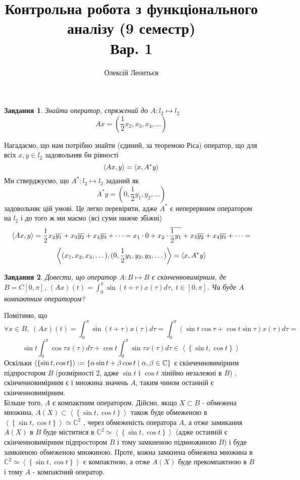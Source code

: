 \documentclass[12pt]{article} %
\title{Контрольна робота з функціонального аналізу (9 семестр)\\Вар. 1}
\author{Олексій Леонтьєв}
\newtheorem{prob}{Завдання}
\begin{document}
\maketitle
\begin{prob}Знайти оператор, спряжений до $A:l_2\mapsto l_2$\[Ax=(\frac{1}{2}x_2,x_3,x_4,\dots)\]\end{prob}
	Нагадаємо, що нам потрібно знайти (єдиний, за теоремою Ріса) оператор, що для всіх $x,y\in l_2$ задовольняв би рівності
	\[\left<Ax,y\right>=\left<x,A^*y\right>\]
	Ми стверджуємо, що $A^*:l_2\mapsto l_2$ заданий як
	\[A^*y=(0,\frac{1}{2}y_1,y_2,\dots)\]
	задовольняє цій умові. Це легко перевірити, адже $A^*$ є неперервним оператором на $l_2$ і до того ж ми маємо (всі суми нижче збіжні)
	\[\left<Ax,y\right>=
	\frac{1}{2}x_2\overline{y_1}+x_3\overline{y_2}+x_4\overline{y_3}+\dots=
	x_1\cdot 0+x_2\cdot\overline{\frac{1}{2}y_1}+x_3\overline{y_2}+x_4\overline{y_3}+\dots=\]
	\[\left<(x_1,x_2,x_3,\dots),(0,\frac{1}{2}y_1,y_2,y_3,\dots)\right>=\left<x,A^*y\right>\]
\begin{prob}Довести, що оператор $A:B\mapsto B$ є скінченновимірним, де $B=C[0,\pi]$, $(Ax)(t)=\int_0^{\pi}\sin(t+\tau)x(\tau)d\tau,\;t\in[0,\pi]$.
	Чи буде $A$ компактним оператором?\end{prob}
	Помітимо, що
	\[\forall x\in B,\;(Ax)(t)=\int_0^{\pi}\sin(t+\tau)x(\tau)d\tau=\int_0^{\pi}\left(\sin t\cos\tau+\cos t\sin\tau\right)x(\tau)d\tau=\]
	\[\sin t\int_0^{\pi}\cos\tau x(\tau)d\tau+\cos t\int_0^{\pi}\sin\tau x(\tau)d\tau\in \left<\left\{\sin t,\cos t\right\}\right>\]
	Оскільки $\left<\left\{\sin t,\cos t\right\}\right>:=\left\{\alpha\sin t+\beta\cos t\mid \alpha,\beta\in\mathbb{C}\right\}$ є скінченновимірним
	підпростором $B$ (розмірності 2, адже $\sin t$ і $\cos t$ лінійно незалежні в $B$)
	, скінченновимірним є і множина значень $A$, таким чином останній є скінченновимірним.\\
	Більше того, $A$ є компактним оператором. Дійсно, якщо $X\subset B$ - обмежена множина, $A(X)\subset
	\left<\left\{\sin t,\cos t\right\}\right>$ також буде обмеженою в $\left<\left\{\sin t,\cos t\right\}\right>\simeq \mathbb{C}^2$
	, через обмеженість оператора $A$, а отже замикання $A(X)$ в $B$ буде міститися в $\mathbb{C}^2\simeq
	\left<\left\{\sin t,\cos t\right\}\right>$
	(адже останній є скінченновимірним підпростором $B$ і тому замкненою підмножиною $B$) і буде замкненою обмеженою множиною. Проте, 
	кожна замкнена обмежена множина в $\mathbb{C}^2\simeq
	\left<\left\{\sin t,\cos t\right\}\right>$ є компактною, а отже $A(X)$ буде прекомпактною в $B$ і тому $A$ - компактний оператор.
\end{document}
